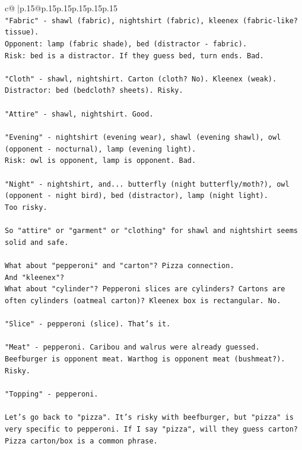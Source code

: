 \documentclass{article}
\begin{document}
{\begin{supertabular}{c@{$\;$}|p{.15\linewidth}@{}p{.15\linewidth}p{.15\linewidth}p{.15\linewidth}p{.15\linewidth}p{.15\linewidth}}
{{{\\ 
\texttt{"Fabric" {-} shawl (fabric), nightshirt (fabric), kleenex (fabric{-}like? tissue).} \\
\texttt{Opponent: lamp (fabric shade), bed (distractor {-} fabric).} \\
\texttt{Risk: bed is a distractor. If they guess bed, turn ends. Bad.} \\
\\ 
\texttt{"Cloth" {-} shawl, nightshirt. Carton (cloth? No). Kleenex (weak).} \\
\texttt{Distractor: bed (bedcloth? sheets). Risky.} \\
\\ 
\texttt{"Attire" {-} shawl, nightshirt. Good.} \\
\\ 
\texttt{"Evening" {-} nightshirt (evening wear), shawl (evening shawl), owl (opponent {-} nocturnal), lamp (evening light).} \\
\texttt{Risk: owl is opponent, lamp is opponent. Bad.} \\
\\ 
\texttt{"Night" {-} nightshirt, and... butterfly (night butterfly/moth?), owl (opponent {-} night bird), bed (distractor), lamp (night light).} \\
\texttt{Too risky.} \\
\\ 
\texttt{So "attire" or "garment" or "clothing" for shawl and nightshirt seems solid and safe.} \\
\\ 
\texttt{What about "pepperoni" and "carton"? Pizza connection.} \\
\texttt{And "kleenex"?} \\
\texttt{What about "cylinder"? Pepperoni slices are cylinders? Cartons are often cylinders (oatmeal carton)? Kleenex box is rectangular. No.} \\
\\ 
\texttt{"Slice" {-} pepperoni (slice). That's it.} \\
\\ 
\texttt{"Meat" {-} pepperoni. Caribou and walrus were already guessed. Beefburger is opponent meat. Warthog is opponent meat (bushmeat?). Risky.} \\
\\ 
\texttt{"Topping" {-} pepperoni.} \\
\\ 
\texttt{Let's go back to "pizza". It's risky with beefburger, but "pizza" is very specific to pepperoni. If I say "pizza", will they guess carton? Pizza carton/box is a common phrase. } \\
}}}
\end{supertabular}}
\end{document}
